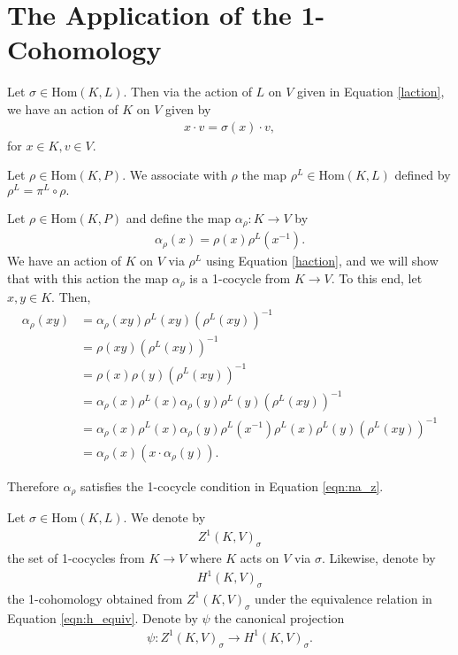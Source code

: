 \section{The Application of the 1-Cohomology}
Let $\sigma \in \mathrm{Hom}(K, L)$. Then via the action of $L$ on $V$ given in Equation \ref{laction}, we have an action of $K$ on $V$ given by
\begin{align} \label{haction} x \cdot v = \sigma(x) \cdot v, \end{align}
for $x \in K, v \in V$.

\begin{definition} Let $\rho \in \mathrm{Hom}(K, P)$. We associate with $\rho$ the map $\rho^L \in \mathrm{Hom}(K, L)$ defined by
$\rho^L = \pi^L \circ \rho.$
\end{definition}

Let $\rho \in \mathrm{Hom}(K, P)$ and define the map $\alpha_\rho: K \rightarrow V$ by
\begin{align}\label{rho:alpha}
\alpha_\rho(x) = \rho(x)\rho^L(x^{-1}).
\end{align}
We have an action of $K$ on $V$ via $\rho^L$ using Equation \ref{haction}, and we will show that with this action the map $\alpha_\rho$ is a 1-cocycle from $K \rightarrow V$. To this end, let $x, y \in K$.
Then,
\begin{align*} \alpha_\rho(xy) &= \alpha_\rho(xy) \rho^L(xy) \left(\rho^L(xy)\right)^{-1} \\
	&= \rho(xy) \left(\rho^L(xy)\right)^{-1} \\
	&= \rho(x) \rho(y) \left(\rho^L(xy)\right)^{-1} \\
	&= \alpha_\rho(x) \rho^L(x) \alpha_\rho(y) \rho^L(y) \left(\rho^L(xy)\right)^{-1} \\
	&= \alpha_\rho(x) \rho^L(x) \alpha_\rho(y) \rho^L(x^{-1}) \rho^L(x) \rho^L(y) \left(\rho^L(xy)\right)^{-1} \\
	&= \alpha_\rho(x) \left(x \cdot \alpha_\rho(y)\right). 
\end{align*}

Therefore $\alpha_\rho$ satisfies the 1-cocycle condition in Equation \ref{eqn:na_z}.

\begin{definition}\label{h1sigma} Let $\sigma \in \mathrm{Hom}(K, L)$. We denote by
\begin{align*} Z^1(K, V)_\sigma \end{align*}
the set of 1-cocycles from $K \rightarrow V$ where $K$ acts on $V$ via $\sigma$.
Likewise, denote by
\begin{align*} H^1(K, V)_\sigma \end{align*}
the 1-cohomology obtained from $Z^1(K, V)_\sigma$ under the equivalence relation in Equation \ref{eqn:h_equiv}. Denote by $\psi$ the canonical projection
\begin{align*} \psi : Z^1(K, V)_\sigma \rightarrow H^1(K, V)_\sigma. \end{align*}
\end{definition} 

